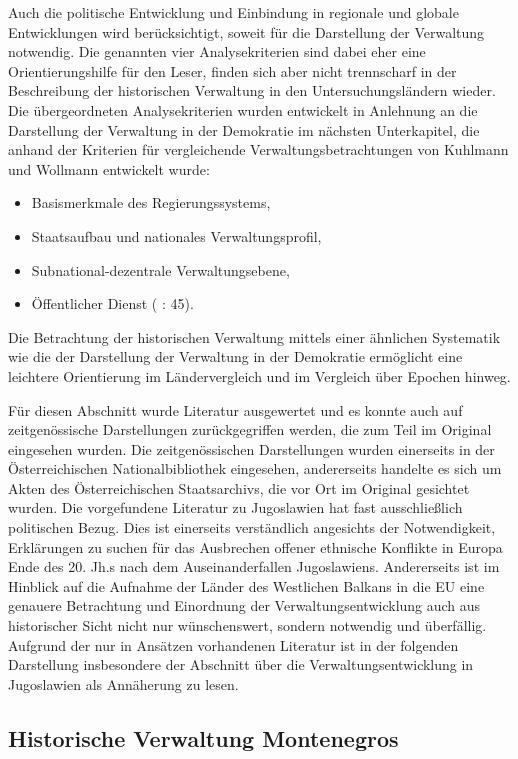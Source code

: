 Auch die politische Entwicklung und Einbindung in regionale und globale Entwicklungen wird berücksichtigt, soweit für die Darstellung der Verwaltung notwendig. Die genannten vier Analysekriterien sind dabei eher eine Orientierungshilfe für den Leser, finden sich aber nicht trennscharf in der Beschreibung der historischen Verwaltung in den Untersuchungsländern wieder. Die übergeordneten Analysekriterien wurden entwickelt in Anlehnung an die Darstellung der Verwaltung in der Demokratie im nächsten Unterkapitel, die anhand der Kriterien für vergleichende Verwaltungsbetrachtungen von Kuhlmann und Wollmann entwickelt wurde: 
\begin{itemize} \itemsep1pt \parskip0pt 
\item Basismerkmale des Regierungssystems,
\item Staatsaufbau und nationales Verwaltungsprofil, 
\item Subnational-dezentrale Verwaltungsebene,
\item Öffentlicher Dienst (\cite{kuhwol} : 45).
\end{itemize}
Die Betrachtung der historischen Verwaltung mittels einer ähnlichen Systematik wie die der Darstellung der Verwaltung in der Demokratie ermöglicht eine leichtere Orientierung im Ländervergleich und im Vergleich über Epochen hinweg. \par
Für diesen Abschnitt wurde Literatur ausgewertet und es konnte auch auf zeitgenössische Darstellungen zurückgegriffen werden, die zum Teil im Original eingesehen wurden. Die zeitgenössischen Darstellungen wurden einerseits in der Österreichischen Nationalbibliothek eingesehen, andererseits handelte es sich um Akten des Österreichischen Staatsarchivs, die vor Ort im Original gesichtet wurden. Die vorgefundene Literatur zu Jugoslawien hat fast ausschließlich politischen Bezug. Dies ist einerseits verständlich angesichts der Notwendigkeit, Erklärungen zu suchen für das Ausbrechen offener ethnische Konflikte in Europa Ende des 20. Jh.s nach dem Auseinanderfallen Jugoslawiens. Andererseits ist im Hinblick auf die Aufnahme der Länder des Westlichen Balkans in die EU eine genauere Betrachtung und Einordnung der Verwaltungsentwicklung auch aus historischer Sicht nicht nur wünschenswert, sondern notwendig und überfällig. Aufgrund der nur in Ansätzen vorhandenen Literatur ist in der folgenden Darstellung insbesondere der Abschnitt über die Verwaltungsentwicklung in Jugoslawien als Annäherung zu lesen.

\subsection{Historische Verwaltung Montenegros }

